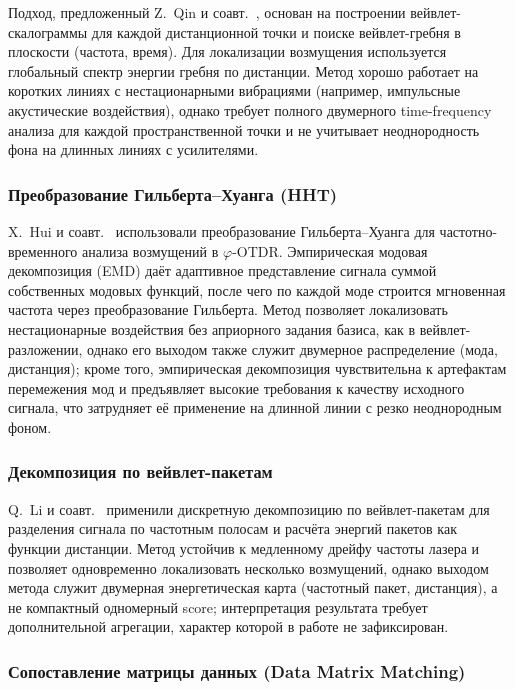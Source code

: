 \documentclass[12pt,a4paper]{extarticle}
\newcommand{\phiOTDR}{$\varphi$-OTDR}
\begin{document}
Подход, предложенный Z.~Qin и соавт.~\cite{Qin2012}, основан на построении вейвлет-скалограммы для каждой дистанционной точки и поиске вейвлет-гребня в плоскости (частота, время). Для локализации возмущения используется глобальный спектр энергии гребня по дистанции. Метод хорошо работает на коротких линиях с нестационарными вибрациями (например, импульсные акустические воздействия), однако требует полного двумерного time-frequency анализа для каждой пространственной точки и не учитывает неоднородность фона на длинных линиях с усилителями.

\subsubsection*{Преобразование Гильберта–Хуанга (HHT)}

X.~Hui и соавт.~\cite{Hui2014} использовали преобразование Гильберта–Хуанга для частотно-временного анализа возмущений в \phiOTDR. Эмпирическая модовая декомпозиция (EMD) даёт адаптивное представление сигнала суммой собственных модовых функций, после чего по каждой моде строится мгновенная частота через преобразование Гильберта. Метод позволяет локализовать нестационарные воздействия без априорного задания базиса, как в вейвлет-разложении, однако его выходом также служит двумерное распределение (мода, дистанция); кроме того, эмпирическая декомпозиция чувствительна к артефактам перемежения мод и предъявляет высокие требования к качеству исходного сигнала, что затрудняет её применение на длинной линии с резко неоднородным фоном.

\subsubsection*{Декомпозиция по вейвлет-пакетам}

Q.~Li и соавт.~\cite{Li2014} применили дискретную декомпозицию по вейвлет-пакетам для разделения сигнала по частотным полосам и расчёта энергий пакетов как функции дистанции. Метод устойчив к медленному дрейфу частоты лазера и позволяет одновременно локализовать несколько возмущений, однако выходом метода служит двумерная энергетическая карта (частотный пакет, дистанция), а не компактный одномерный score; интерпретация результата требует дополнительной агрегации, характер которой в работе не зафиксирован.

\subsubsection*{Сопоставление матрицы данных (Data Matrix Matching)}
\end{document}
